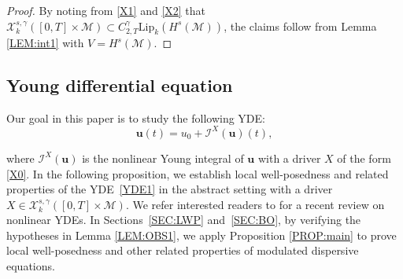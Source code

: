 \documentclass[letterpaper, 11pt,  reqno]{amsart}
\newcommand{\1}{\hspace{0.5mm}\text{I}\hspace{0.5mm}}
\newcommand{\I}{\mathcal{I}}
\newcommand{\noi}{\noindent}
\newcommand{\g}{\gamma}
\newcommand{\M}{\mathcal{M}}
\newcommand{\cX}{\mathcal{X}}
\newcommand{\Lip}{\mathrm{Lip}}
\newcommand{\uu}{\mathbf{u}}
\numberwithin{equation}{section}
\numberwithin{theorem}{section}
\begin{document}
\begin{proof}
 By noting from \eqref{X1} and \eqref{X2} that
$\cX^{s, \g}_k([0, T]\times \M) \subset  C^\g_{2, T}\Lip_k(H^s(\M))$, 
the claims follow from Lemma \ref{LEM:int1} with $V = H^s(\M)$.
\end{proof}


 









\subsection{Young differential equation}
\label{SUBSEC:Y3}



Our goal in this paper is to 
 study the 
following YDE:
\begin{equation}
\label{YDE1}
\uu(t) = u_0 + \I^X(\uu)(t), 
\end{equation}



\noi
where $\I^X(\uu)$ is the nonlinear Young integral of 
$\uu$ with a driver $X$  of the form \eqref{X0}.
In the following proposition, 
we establish local well-posedness
and related properties
of 
the YDE~\eqref{YDE1} in the abstract setting  with a driver $X\in \cX^{s, \g}_k([0, T] \times \M)$. 
We refer interested readers
 to \cite{G23} for a recent review on
nonlinear YDEs.
In Sections~\ref{SEC:LWP}
and~\ref{SEC:BO}, 
by verifying the hypotheses
in Lemma \ref{LEM:OBS1}, 
we apply Proposition \ref{PROP:main}
to prove local well-posedness
and other related properties
of modulated dispersive equations.
\end{document}

